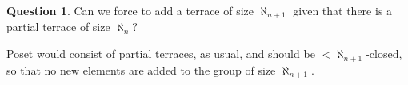 \documentclass[11pt]{amsart}
\theoremstyle{definition}
\newtheorem{question}{Question}
\theoremstyle{remark}
\newcommand{\To}{\longrightarrow}
\newcommand{\g}{\textup{\textbf{g}}}
\begin{document}
%

\begin{question} Can we force to add a terrace of size $\aleph_{n+1}$ given that there is a partial terrace of size $\aleph_n$? \end{question}
Poset would consist of partial terraces, as usual, and should be $<\aleph_{n+1}$-closed, so that no new elements are added to the group of size $\aleph_{n+1}$.




%
\end{document}
